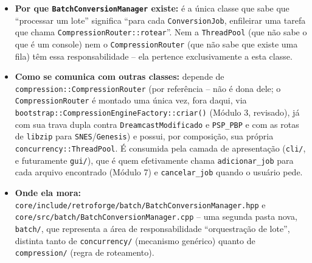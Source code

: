 \begin{itemize}
    \item \textbf{Por que \texttt{BatchConversionManager} existe:} é a única classe que sabe que ``processar um lote'' significa ``para cada \texttt{ConversionJob}, enfileirar uma tarefa que chama \texttt{CompressionRouter::rotear}''. Nem a \texttt{ThreadPool} (que não sabe o que é um console) nem o \texttt{CompressionRouter} (que não sabe que existe uma fila) têm essa responsabilidade -- ela pertence exclusivamente a esta classe.
    \item \textbf{Como se comunica com outras classes:} depende de \texttt{compression::CompressionRouter} (por referência -- não é dona dele; o \texttt{CompressionRouter} é montado uma única vez, fora daqui, via \texttt{bootstrap::CompressionEngineFactory::criar()} (Módulo 3, revisado), já com sua trava dupla contra \texttt{DreamcastModificado} e \texttt{PSP\_PBP} e com as rotas de \texttt{libzip} para \texttt{SNES}/\texttt{Genesis}) e possui, por composição, sua própria \texttt{concurrency::ThreadPool}. É consumida pela camada de apresentação (\texttt{cli/}, e futuramente \texttt{gui/}), que é quem efetivamente chama \texttt{adicionar\_job} para cada arquivo encontrado (Módulo 7) e \texttt{cancelar\_job} quando o usuário pede.
    \item \textbf{Onde ela mora:} \texttt{core/include/retroforge/batch/BatchConversionManager.hpp} e \texttt{core/src/batch/BatchConversionManager.cpp} -- uma segunda pasta nova, \texttt{batch/}, que representa a área de responsabilidade ``orquestração de lote'', distinta tanto de \texttt{concurrency/} (mecanismo genérico) quanto de \texttt{compression/} (regra de roteamento).
\end{itemize}

